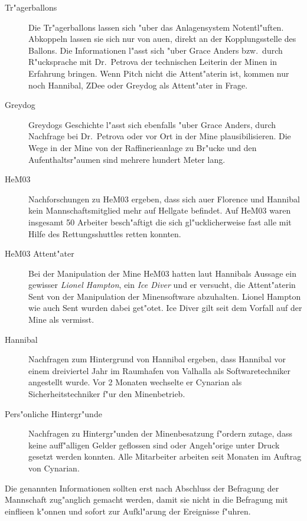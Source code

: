 \begin{description}
	\item[Tr"agerballons] Die Tr"agerballons lassen sich "uber das Anlagensystem Notentl"uften. Abkoppeln lassen sie sich nur von au\3en, 
		direkt an der Kopplungsstelle des Ballons. Die Informationen l"asst sich "uber Grace Anders bzw.~durch R"ucksprache mit Dr.~Petrova der technischen Leiterin der Minen in Erfahrung bringen. Wenn Pitch nicht die Attent"aterin ist, kommen nur noch Hannibal, ZDee oder Greydog als Attent"ater in Frage.
	\item[Greydog] Greydogs Geschichte l"asst sich ebenfalls "uber Grace Anders, durch Nachfrage bei Dr.~Petrova oder vor Ort in der Mine 
		plausibilisieren. Die Wege in der Mine von der Raffinerieanlage zu Br"ucke und den Aufenthaltsr"aumen sind mehrere hundert Meter lang.
	\item[HeM03] Nachforschungen zu HeM03 ergeben, dass sich au\3er Florence und Hannibal kein Mannschaftsmitglied mehr auf Hellgate befindet. Auf HeM03 waren insgesamt 50 Arbeiter besch"aftigt die sich gl"ucklicherweise fast alle mit Hilfe des Rettungsshuttles retten konnten. 
	\item[HeM03 Attent"ater] Bei der Manipulation der Mine HeM03 hatten laut Hannibals Aussage ein gewisser \emph{Lionel Hampton}, ein 
		\emph{Ice Diver} und er versucht, die Attent"aterin Sent von der Manipulation der Minensoftware abzuhalten. Lionel Hampton wie auch Sent wurden dabei get"otet. Ice Diver gilt seit dem Vorfall auf der Mine als vermisst.
	\item[Hannibal] Nachfragen zum Hintergrund von Hannibal ergeben, dass Hannibal vor einem dreiviertel Jahr im Raumhafen von Valhalla als 
		Softwaretechniker angestellt wurde. Vor 2 Monaten wechselte er Cynarian als Sicherheitstechniker f"ur den Minenbetrieb. 
	\item[Pers"onliche Hintergr"unde] Nachfragen zu Hintergr"unden der Minenbesatzung f"ordern zutage, dass keine auff"alligen Gelder 
		geflossen sind oder Angeh"orige unter Druck gesetzt werden konnten. Alle Mitarbeiter arbeiten seit Monaten im Auftrag von Cynarian.
\end{description}

Die genannten Informationen sollten erst nach Abschluss der Befragung der Mannschaft zug"anglich gemacht werden, damit sie nicht in die Befragung mit einflie\3en k"onnen und sofort zur Aufkl"arung der Ereignisse f"uhren.

